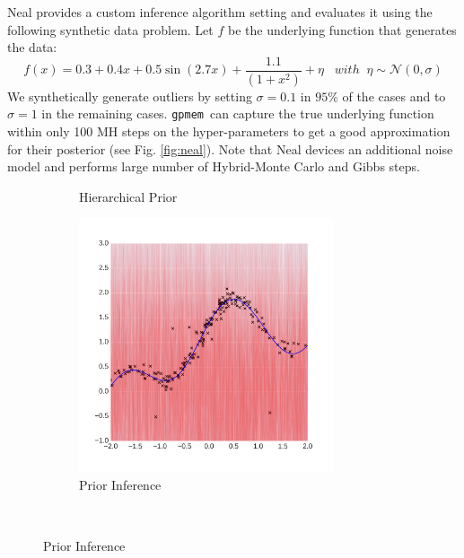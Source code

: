 \documentclass{article} %
\newcommand{\gpmem}{\texttt{gpmem}}
\begin{document}
Neal provides a custom inference algorithm setting and evaluates it using the following synthetic data problem. Let $f$ be the underlying function that generates the data:
\begin{equation}
f(x) =  0.3 + 0.4 x + 0.5 \sin(2.7x) + \frac{1.1}{(1+ x^2)} + \eta \;\;\; with\;\;\eta \sim \mathcal{N}(0,\sigma)
\end{equation}
We synthetically generate outliers by setting $\sigma = 0.1$ in $95\%$ of the cases and to $\sigma = 1$ in the remaining cases. \gpmem\  can capture the true underlying function within only 100 MH steps on the hyper-parameters to get a good approximation for their posterior (see Fig. \ref{fig:neal}). Note that Neal devices an additional noise model and performs large number of Hybrid-Monte Carlo and Gibbs steps.  
\begin{figure}
        \centering
        \begin{subfigure}[b]{0.49\textwidth} \centering
                
                \caption{Hierarchical Prior}
                \label{fig:NealpriorStruct}
        \end{subfigure}%
        \begin{subfigure}[b]{0.49\textwidth} \centering
                \includegraphics[height=7.5cm]{figs/neal_se_1final.png}
                \caption{Prior Inference}
                \label{fig:NealBO}
        \end{subfigure}%
        ~ %
          

\end{figure}
\end{document}
